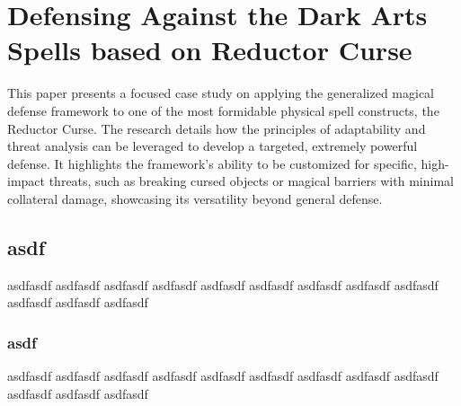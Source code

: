 \chapter{Defensing Against the Dark Arts Spells based on Reductor Curse}
This paper presents a focused case study on applying the generalized magical defense framework to one of the most formidable physical spell constructs, the Reductor Curse. The research details how the principles of adaptability and threat analysis can be leveraged to develop a targeted, extremely powerful defense. It highlights the framework's ability to be customized for specific, high-impact threats, such as breaking cursed objects or magical barriers with minimal collateral damage, showcasing its versatility beyond general defense.~\cite{reductorcurse2025magic}


\section{asdf}
asdfasdf asdfasdf asdfasdf asdfasdf asdfasdf asdfasdf asdfasdf asdfasdf asdfasdf asdfasdf asdfasdf asdfasdf


\subsection{asdf}
asdfasdf asdfasdf asdfasdf asdfasdf asdfasdf asdfasdf asdfasdf asdfasdf asdfasdf asdfasdf asdfasdf asdfasdf


